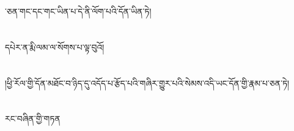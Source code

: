 ་ཅན་གང་དང་གང་ཡིན་པ་དེ་ནི་ལོག་པའི་དོན་ཡིན་ཏེ།\chapter{ }དཔེར་ན་རྨི་ལམ་ལ་སོགས་པ་ལྟ་བུའོ།\chapter{ }།ཕྱི་རོལ་གྱི་དོན་མཐོང་བ་ཉིད་དུ་འདོད་པ་རྩོད་པའི་གཞིར་གྱུར་པའི་སེམས་འདི་ཡང་དོན་གྱི་རྣམ་པ་ཅན་ཏེ།\chapter{ }རང་བཞིན་གྱི་གཏན